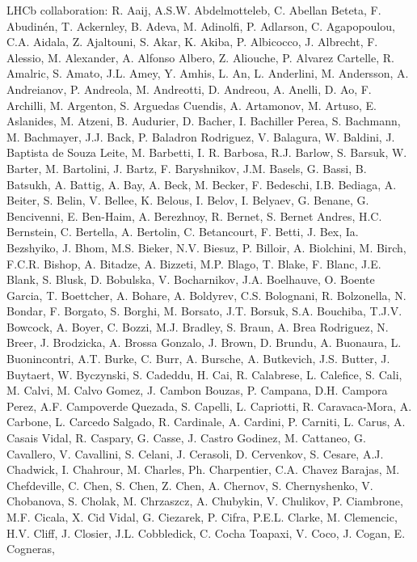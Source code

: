 LHCb collaboration:
R. Aaij,
A.S.W. Abdelmotteleb,
C. Abellan Beteta,
F. Abudin{\'e}n,
T. Ackernley,
B. Adeva,
M. Adinolfi,
P. Adlarson,
C. Agapopoulou,
C.A. Aidala,
Z. Ajaltouni,
S. Akar,
K. Akiba,
P. Albicocco,
J. Albrecht,
F. Alessio,
M. Alexander,
A. Alfonso Albero,
Z. Aliouche,
P. Alvarez Cartelle,
R. Amalric,
S. Amato,
J.L. Amey,
Y. Amhis,
L. An,
L. Anderlini,
M. Andersson,
A. Andreianov,
P. Andreola,
M. Andreotti,
D. Andreou,
A. Anelli,
D. Ao,
F. Archilli,
M. Argenton,
S. Arguedas Cuendis,
A. Artamonov,
M. Artuso,
E. Aslanides,
M. Atzeni,
B. Audurier,
D. Bacher,
I. Bachiller Perea,
S. Bachmann,
M. Bachmayer,
J.J. Back,
P. Baladron Rodriguez,
V. Balagura,
W. Baldini,
J. Baptista de Souza Leite,
M. Barbetti,
I. R. Barbosa,
R.J. Barlow,
S. Barsuk,
W. Barter,
M. Bartolini,
J. Bartz,
F. Baryshnikov,
J.M. Basels,
G. Bassi,
B. Batsukh,
A. Battig,
A. Bay,
A. Beck,
M. Becker,
F. Bedeschi,
I.B. Bediaga,
A. Beiter,
S. Belin,
V. Bellee,
K. Belous,
I. Belov,
I. Belyaev,
G. Benane,
G. Bencivenni,
E. Ben-Haim,
A. Berezhnoy,
R. Bernet,
S. Bernet Andres,
H.C. Bernstein,
C. Bertella,
A. Bertolin,
C. Betancourt,
F. Betti,
J.  Bex,
Ia. Bezshyiko,
J. Bhom,
M.S. Bieker,
N.V. Biesuz,
P. Billoir,
A. Biolchini,
M. Birch,
F.C.R. Bishop,
A. Bitadze,
A. Bizzeti,
M.P. Blago,
T. Blake,
F. Blanc,
J.E. Blank,
S. Blusk,
D. Bobulska,
V. Bocharnikov,
J.A. Boelhauve,
O. Boente Garcia,
T. Boettcher,
A.  Bohare,
A. Boldyrev,
C.S. Bolognani,
R. Bolzonella,
N. Bondar,
F. Borgato,
S. Borghi,
M. Borsato,
J.T. Borsuk,
S.A. Bouchiba,
T.J.V. Bowcock,
A. Boyer,
C. Bozzi,
M.J. Bradley,
S. Braun,
A. Brea Rodriguez,
N. Breer,
J. Brodzicka,
A. Brossa Gonzalo,
J. Brown,
D. Brundu,
A. Buonaura,
L. Buonincontri,
A.T. Burke,
C. Burr,
A. Bursche,
A. Butkevich,
J.S. Butter,
J. Buytaert,
W. Byczynski,
S. Cadeddu,
H. Cai,
R. Calabrese,
L. Calefice,
S. Cali,
M. Calvi,
M. Calvo Gomez,
J. Cambon Bouzas,
P. Campana,
D.H. Campora Perez,
A.F. Campoverde Quezada,
S. Capelli,
L. Capriotti,
R. Caravaca-Mora,
A. Carbone,
L. Carcedo Salgado,
R. Cardinale,
A. Cardini,
P. Carniti,
L. Carus,
A. Casais Vidal,
R. Caspary,
G. Casse,
J. Castro Godinez,
M. Cattaneo,
G. Cavallero,
V. Cavallini,
S. Celani,
J. Cerasoli,
D. Cervenkov,
S.  Cesare,
A.J. Chadwick,
I. Chahrour,
M. Charles,
Ph. Charpentier,
C.A. Chavez Barajas,
M. Chefdeville,
C. Chen,
S. Chen,
Z. Chen,
A. Chernov,
S. Chernyshenko,
V. Chobanova,
S. Cholak,
M. Chrzaszcz,
A. Chubykin,
V. Chulikov,
P. Ciambrone,
M.F. Cicala,
X. Cid Vidal,
G. Ciezarek,
P. Cifra,
P.E.L. Clarke,
M. Clemencic,
H.V. Cliff,
J. Closier,
J.L. Cobbledick,
C. Cocha Toapaxi,
V. Coco,
J. Cogan,
E. Cogneras,
